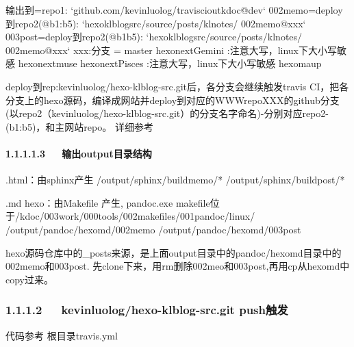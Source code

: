 \documentclass[letterpaper,12pt,english]{sphinxmanual}
\begin{document}
\begin{itemize}
\begin{sphinxVerbatim}[commandchars=\\\{\}]
输出到=\PYGZgt{}repo1: {}`github.com/kevinluolog/travisci\PYGZus{}out\PYGZus{}kdoc@dev{}`
002memo=\PYGZgt{}deploy到repo2\PYGZhy{}(@b1:b5): {}`hexo\PYGZhy{}klblog\PYGZhy{}src/source/\PYGZus{}posts/kl\PYGZus{}notes/   002memo@xxx{}`
003post=\PYGZgt{}deploy到repo2\PYGZhy{}(@b1\PYGZhy{}b5): {}`hexo\PYGZhy{}klblog\PYGZhy{}src/source/\PYGZus{}posts/kl\PYGZus{}notes/   002memo@xxx{}`
xxx:分支 =
     master
     hexo\PYGZhy{}next\PYGZhy{}Gemini :注意大写，linux下大小写敏感
     hexo\PYGZhy{}next\PYGZhy{}muse
     hexo\PYGZhy{}next\PYGZhy{}Pisces :注意大写，linux下大小写敏感
     hexo\PYGZhy{}maup
\end{sphinxVerbatim}

deploy到rep:kevinluolog/hexo-klblog-src.git后，各分支会继续触发travis CI，把各分支上的hexo源码，编译成网站并deploy到对应的WWWrepoXXX的github分支(以repo2（kevinluolog/hexo-klblog-src.git）的分支名字命名)-分别对应repo2-(b1:b5)，和主网站repo。
详细参考 {\hyperref[\detokenize{001software/001install/001._u7f51_u7ad9/gitpage:kevinluolog-hexo-klblog-src-git-push}]{}}

\end{itemize}


\paragraph{1.1.1.1.3   输出output目录结构}
\label{\detokenize{001software/001install/001._u7f51_u7ad9/gitpage:output}}
\begin{sphinxVerbatim}[commandchars=\\\{\}]
.html：由sphinx产生
/output/sphinx/build\PYGZhy{}memo/*
/output/sphinx/build\PYGZhy{}post/*

.md hexo：由Makefile 产生, pandoc.exe
makefile位于/kdoc/003work/000tools/002makefiles/001pandoc/linux/
/output/pandoc/hexomd/002memo
/output/pandoc/hexomd/003post
\end{sphinxVerbatim}

hexo源码仓库中的\_posts来源，是上面output目录中的pandoc/hexomd目录中的002memo和003post. 先clone下来，用rm删除002meo和003post,再用cp从hexomd中copy过来。


\subsubsection{1.1.1.2   kevinluolog/hexo-klblog-src.git push触发}
\label{\detokenize{001software/001install/001._u7f51_u7ad9/gitpage:kevinluolog-hexo-klblog-src-git-push}}
代码参考 根目录travis.yml
\end{document}
